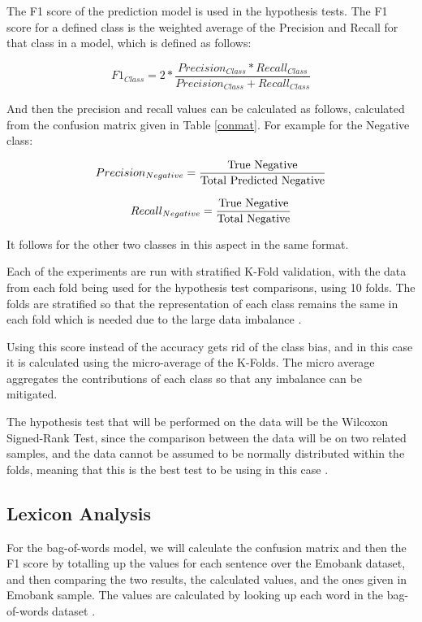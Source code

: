 The F1 score of the prediction model is used in the hypothesis tests. The F1 score for a defined class is the weighted average of the Precision and Recall for that class in a model, which is defined as follows: 

$$ F1_{Class} = 2 * \frac{Precision_{Class} * Recall_{Class}}{Precision_{Class} + Recall_{Class}} $$

And then the precision and recall values can be calculated as follows, calculated from the confusion matrix given in Table \ref{conmat}.
For example for the Negative class:

$$ Precision_{Negative} = \frac{\textnormal{True Negative}}{\textnormal{Total Predicted Negative}} $$

$$ Recall_{Negative} = \frac{\textnormal{True Negative}}{\textnormal{Total Negative}} $$

It follows for the other two classes in this aspect in the same format.

Each of the experiments are run with stratified K-Fold validation, with the data from each fold being used for the hypothesis test comparisons, using 10 folds. The folds are stratified so that the representation of each class remains the same in each fold which is needed due to the large data imbalance \cite{kohavi1995study}.

Using this score instead of the accuracy gets rid of the class bias, and in this case it is calculated using the micro-average of the K-Folds. The micro average aggregates the contributions of each class so that any imbalance can be mitigated.

The hypothesis test that will be performed on the data will be the Wilcoxon Signed-Rank Test, since the comparison between the data will be on two related samples, and the data cannot be assumed to be normally distributed within the folds, meaning that this is the best test to be using in this case \cite{wilcoxon1970critical}.

\subsection{Lexicon Analysis}

For the bag-of-words model, we will calculate the confusion matrix and then the F1 score by totalling up the values for each sentence over the Emobank dataset, and then comparing the two results, the calculated values, and the ones given in Emobank sample. The values are calculated by looking up each word in the bag-of-words dataset \cite{wordsData}.

